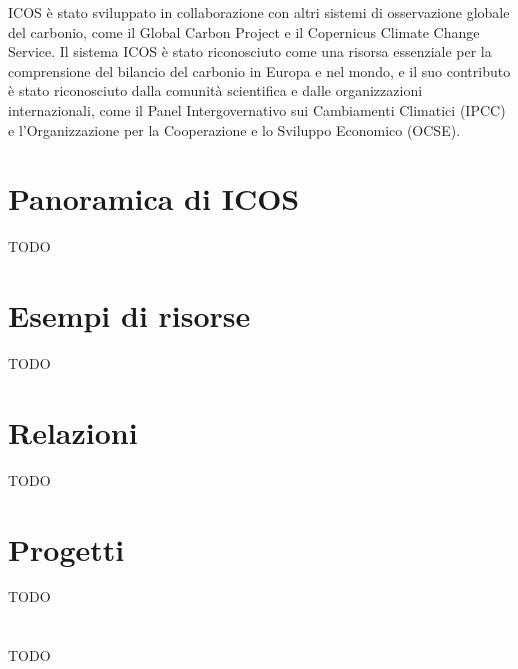 \documentclass[12pt,a4paper,openright,twoside]{book}
\begin{document}
ICOS è stato sviluppato in collaborazione con altri sistemi di osservazione globale del carbonio,
come il Global Carbon Project e il Copernicus Climate Change Service.
Il sistema ICOS è stato riconosciuto come una risorsa essenziale per la comprensione
del bilancio del carbonio in Europa e nel mondo, e il suo contributo è stato riconosciuto
dalla comunità scientifica e dalle organizzazioni internazionali, come il Panel Intergovernativo
sui Cambiamenti Climatici (IPCC) e l'Organizzazione per la Cooperazione e lo Sviluppo Economico (OCSE).\\

\chapter{Panoramica di ICOS}
\label{chap:panoramica}
TODO
\chapter{Esempi di risorse}
\label{chap:esempi}
TODO
\chapter{Relazioni}
\label{chap:relazioni}
TODO
\chapter{Progetti}
\label{chap:progetti}
TODO
\chapter{\conclusionsname}
\label{chap:conclusions}
TODO




\end{document}
